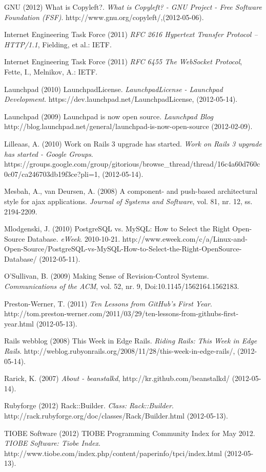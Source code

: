 \begin{flushleft}
GNU (2012) What is Copyleft?. \emph{What is Copyleft? - GNU Project - Free Software Foundation (FSF)}. http://www.gnu.org/copyleft/,(2012-05-06).

Internet Engineering Task Force (2011) \emph{RFC 2616 Hypertext Transfer Protocol -- HTTP/1.1}, Fielding, et al.: IETF.

Internet Engineering Task Force (2011) \emph{RFC 6455 The WebSocket Protocol}, Fette, I., Melnikov, A.: IETF.

Launchpad (2010) LaunchpadLicense. \emph{LaunchpadLicense - Launchpad Development}. https://dev.launchpad.net/LaunchpadLicense, (2012-05-14).

Launchpad (2009) Launchpad is now open source. \emph{Launchpad Blog} http://blog.launchpad.net/general/launchpad-is-now-open-source (2012-02-09).

Lilleaas, A. (2010) Work on Rails 3 upgrade has started. \emph{Work on Rails 3 upgrade has started - Google Groups}. https://groups.google.com/group/gitorious/browse\_thread/thread/16c4a60d760c0c07/ca246703db19f3ce?pli=1, (2012-05-14).

Mesbah, A., van Deursen, A. (2008) A component- and push-based architectural style for ajax applications. \emph{Journal of Systems and Software}, vol. 81, nr. 12, ss. 2194-2209.

Mlodgenski, J. (2010) PostgreSQL vs. MySQL: How to Select the Right Open-Source Database. \emph{eWeek}. 2010-10-21.  http://www.eweek.com/c/a/Linux-and-Open-Source/PostgreSQL-vs-MySQL-How-to-Select-the-Right-OpenSource-Database/ (2012-05-11).

O'Sullivan, B. (2009) Making Sense of Revision-Control Systems. \emph{Communications of the ACM}, vol. 52, nr. 9, Doi:10.1145/1562164.1562183.

Preston-Werner, T. (2011) \emph{Ten Lessons from GitHub's First Year}. http://tom.preston-werner.com/2011/03/29/ten-lessons-from-githubs-first-year.html (2012-05-13).

Rails webblog (2008) This Week in Edge Rails. \emph{Riding Rails: This Week in Edge Rails}. http://weblog.rubyonrails.org/2008/11/28/this-week-in-edge-rails/, (2012-05-14).

Rarick, K. (2007) \emph{About - beanstalkd}, http://kr.github.com/beanstalkd/ (2012-05-14).

Rubyforge (2012) Rack::Builder. \emph{Class: Rack::Builder}. http://rack.rubyforge.org/doc/classes/Rack/Builder.html (2012-05-13).

TIOBE Software (2012) TIOBE Programming Community Index for May 2012. \emph{TIOBE Software: Tiobe Index}. http://www.tiobe.com/index.php/content/paperinfo/tpci/index.html (2012-05-13).


\end{flushleft}
